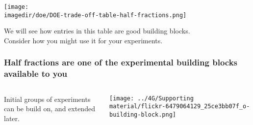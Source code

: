 \begin{frame}\frametitle{}
	\texttt{[image: \\imagedir/doe/DOE-trade-off-table-half-fractions.png]}
	
	\vspace{-10pt}
	We will see how entries in this table are good building blocks.\\
	Consider how you might use it for your experiments.
\end{frame}

\begin{frame}\frametitle{Half fractions are  one of the experimental building blocks available to you}
	
	\begin{columns}[C]
		
	
			Initial groups of experiments can be build on, and extended later.
			
			
				\centerline{\texttt{[image: ../4G/Supporting material/flickr-6479064129\_25ce3bb07f\_o-building-block.png]} \quad
				}
		
				
		
	\end{columns}
\end{frame}



